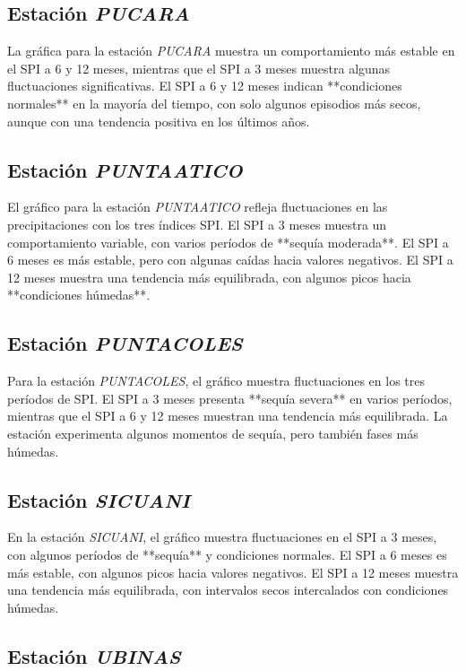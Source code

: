 \subsection*{Estación \textit{PUCARA}}

La gráfica para la estación \textit{PUCARA} muestra un comportamiento más estable en el SPI a 6 y 12 meses, mientras que el SPI a 3 meses muestra algunas fluctuaciones significativas. El SPI a 6 y 12 meses indican **condiciones normales** en la mayoría del tiempo, con solo algunos episodios más secos, aunque con una tendencia positiva en los últimos años.

\subsection*{Estación \textit{PUNTAATICO}}

El gráfico para la estación \textit{PUNTAATICO} refleja fluctuaciones en las precipitaciones con los tres índices SPI. El SPI a 3 meses muestra un comportamiento variable, con varios períodos de **sequía moderada**. El SPI a 6 meses es más estable, pero con algunas caídas hacia valores negativos. El SPI a 12 meses muestra una tendencia más equilibrada, con algunos picos hacia **condiciones húmedas**.

\subsection*{Estación \textit{PUNTACOLES}}

Para la estación \textit{PUNTACOLES}, el gráfico muestra fluctuaciones en los tres períodos de SPI. El SPI a 3 meses presenta **sequía severa** en varios períodos, mientras que el SPI a 6 y 12 meses muestran una tendencia más equilibrada. La estación experimenta algunos momentos de sequía, pero también fases más húmedas.

\subsection*{Estación \textit{SICUANI}}

En la estación \textit{SICUANI}, el gráfico muestra fluctuaciones en el SPI a 3 meses, con algunos períodos de **sequía** y condiciones normales. El SPI a 6 meses es más estable, con algunos picos hacia valores negativos. El SPI a 12 meses muestra una tendencia más equilibrada, con intervalos secos intercalados con condiciones húmedas.

\subsection*{Estación \textit{UBINAS}}

